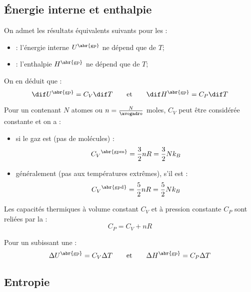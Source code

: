 \subsection{Énergie interne et enthalpie}

\begin{propriete}[admis]
On admet les résultats équivalents suivants pour les  :
\begin{itemize}
\item {} : l'énergie interne $U^{\text{\abr{gp}}}$ ne dépend que de $T$;

\item {} : l'enthalpie $H^{\text{\abr{gp}}}$ ne dépend que de $T$;
\end{itemize}

\noindent On en déduit que :
\[\dif U^{\text{\abr{gp}}} = C_V \dif T \qquad \text{et} \qquad \dif H^{\text{\abr{gp}}} = C_P \dif T\]
\end{propriete}

\begin{propriete}[admis]
Pour un  contenant $N$ atomes ou $n = \frac{N}{\avogadro}$ moles, $C_V$ peut être considérée constante et on a  :
\begin{itemize}
\item si le gaz est  (pas de molécules) :
\[{C_V}^{\text{\abr{gpm}}} = \frac{3}{2} nR = \frac{3}{2} N k_B\]

\item généralement (pas aux températures extrêmes), s'il est  :
\[{C_V}^{\text{\abr{gpd}}} = \frac{5}{2} nR = \frac{5}{2} N k_B\]
\end{itemize}
\end{propriete}

\begin{propriete}
Les capacités thermiques à volume constant $C_V$ et à pression constante $C_P$ sont reliées par la  :
\[C_P = C_V + nR\]
\end{propriete}

\begin{propriete}
Pour un  subissant une  :
\[\Delta U^{\text{\abr{gp}}} = C_V \Delta T \qquad \text{et} \qquad \Delta H^{\text{\abr{gp}}} = C_P \Delta T\]
\end{propriete}



\subsection{Entropie}

